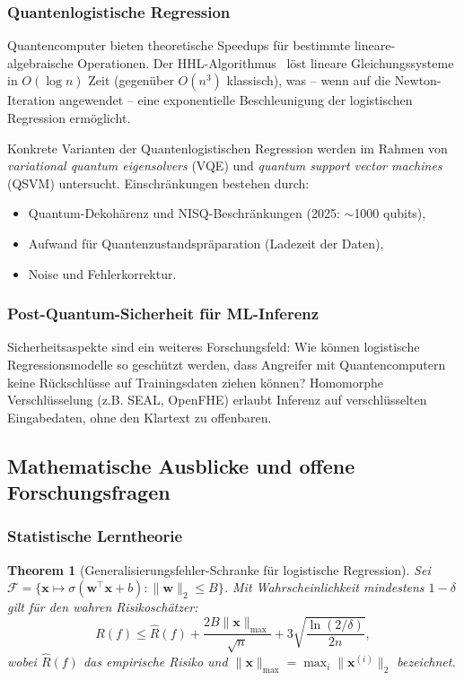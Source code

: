 ﻿\documentclass[12pt, a4paper]{article}
\newtheorem{theorem}{Theorem}[section]
\theoremstyle{definition}
\theoremstyle{remark}
\newcommand{\sigmoid}{\sigma}
\newcommand{\vw}{\bm{w}}
\newcommand{\vx}{\bm{x}}
\newcommand{\T}{\top}
\begin{document}
\subsubsection{Quantenlogistische Regression}

Quantencomputer bieten theoretische Speedups für bestimmte lineare-algebraische Operationen.
Der HHL-Algorithmus~\citep{harrow2009quantum} löst lineare Gleichungssysteme in
$O(\log n)$ Zeit (gegenüber $O(n^3)$ klassisch), was -- wenn auf die Newton-Iteration
angewendet -- eine exponentielle Beschleunigung der logistischen Regression ermöglicht.

Konkrete Varianten der Quantenlogistischen Regression werden im Rahmen von
\emph{variational quantum eigensolvers} (VQE) und \emph{quantum support vector machines}
(QSVM) untersucht. Einschränkungen bestehen durch:
\begin{itemize}
  \item Quantum-Dekohärenz und NISQ-Beschränkungen (2025: $\sim$1000 qubits),
  \item Aufwand für Quantenzustandspräparation (Ladezeit der Daten),
  \item Noise und Fehlerkorrektur.
\end{itemize}

\subsubsection{Post-Quantum-Sicherheit für ML-Inferenz}

Sicherheitsaspekte sind ein weiteres Forschungsfeld: Wie können logistische
Regressionsmodelle so geschützt werden, dass Angreifer mit Quantencomputern keine
Rückschlüsse auf Trainingsdaten ziehen können? Homomorphe Verschlüsselung (z.B. SEAL,
OpenFHE) erlaubt Inferenz auf verschlüsselten Eingabedaten, ohne den Klartext zu offenbaren.

\subsection{Mathematische Ausblicke und offene Forschungsfragen}

\subsubsection{Statistische Lerntheorie}

\begin{theorem}[Generalisierungsfehler-Schranke für logistische Regression]
  Sei $\mathcal{F} = \{\vx \mapsto \sigmoid(\vw^\T\vx+b) : \|\vw\|_2 \leq B\}$. Mit
  Wahrscheinlichkeit mindestens $1-\delta$ gilt für den wahren Risikoschätzer:
  \begin{equation}
    R(f) \leq \hat{R}(f) + \frac{2B\|\vx\|_{\max}}{\sqrt{n}} + 3\sqrt{\frac{\ln(2/\delta)}{2n}},
    \label{eq:generalization}
  \end{equation}
  wobei $\hat{R}(f)$ das empirische Risiko und $\|\vx\|_{\max} = \max_i\|\vx^{(i)}\|_2$ bezeichnet.
\end{theorem}
\end{document}
